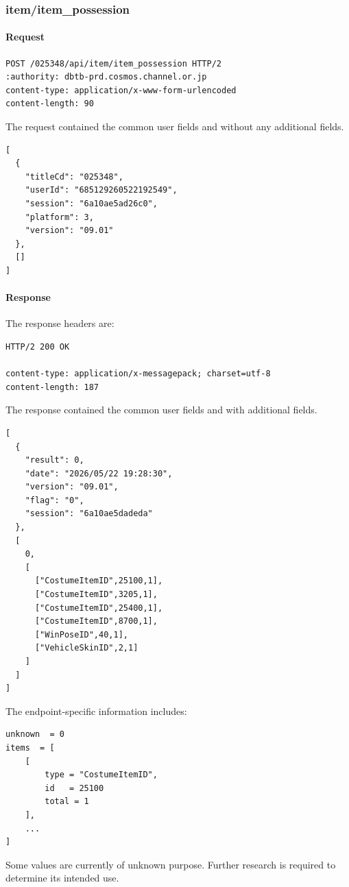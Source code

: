 \subsubsection{item/item\_possession}
\label{subsec:api_item_item_possession}

\paragraph{Request}

\begin{lstlisting}
POST /025348/api/item/item_possession HTTP/2
:authority: dbtb-prd.cosmos.channel.or.jp
content-type: application/x-www-form-urlencoded
content-length: 90
\end{lstlisting}

The request contained the common user fields and without any additional fields.

\begin{lstlisting}
[
  {
    "titleCd": "025348",
    "userId": "685129260522192549",
    "session": "6a10ae5ad26c0",
    "platform": 3,
    "version": "09.01"
  },
  []
]
\end{lstlisting}

\newpage

\paragraph{Response}

The response headers are:

\begin{lstlisting}
HTTP/2 200 OK

content-type: application/x-messagepack; charset=utf-8
content-length: 187
\end{lstlisting}

The response contained the common user fields and with additional fields.

\begin{lstlisting}
[
  {
    "result": 0,
    "date": "2026/05/22 19:28:30",
    "version": "09.01",
    "flag": "0",
    "session": "6a10ae5dadeda"
  },
  [
    0,
    [
      ["CostumeItemID",25100,1],
      ["CostumeItemID",3205,1],
      ["CostumeItemID",25400,1],
      ["CostumeItemID",8700,1],
      ["WinPoseID",40,1],
      ["VehicleSkinID",2,1]
    ]
  ]
]
\end{lstlisting}

The endpoint-specific information includes:

\begin{lstlisting}
unknown  = 0
items  = [
    [
        type = "CostumeItemID",
        id   = 25100
        total = 1
    ],
    ...
]
\end{lstlisting}

\begin{tcolorbox}[colback=yellow!10,colframe=orange!80!black,title=Warning]
Some values are currently of unknown purpose.
Further research is required to determine its intended use.
\end{tcolorbox}

\newpage
